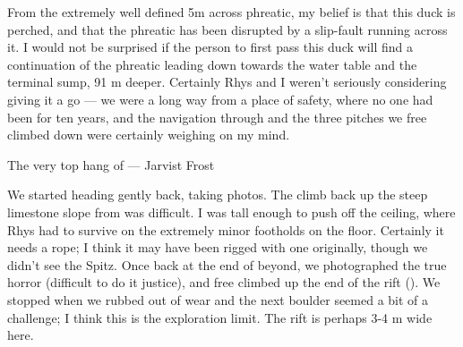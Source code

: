 From the extremely well defined 5m across phreatic, my belief is that this duck is perched, and that the phreatic has been disrupted by a slip-fault running across it. I would not be surprised if the person to first pass this duck will find a continuation of the phreatic leading down towards the water table and the terminal sump, 91 m deeper.
Certainly Rhys and I weren't seriously considering giving it a go --- we were a long way from a place of safety, where no one had been for ten years, and the navigation through  and the three pitches we free climbed down were certainly weighing on my mind.

\begin{marginfigure}
\checkoddpage \ifoddpage \forcerectofloat \else \forceversofloat \fi
\centering
{}
\caption{The very top hang of \protect{}  --- Jarvist Frost}
\label{SpaceOdyssey}
\end{marginfigure}

We started heading gently back, taking photos. The climb back up the steep limestone slope from  was difficult. I was tall enough to push off the ceiling, where Rhys had to survive on the extremely minor footholds on the floor. Certainly it needs a rope; I think it may have been rigged with one originally, though we didn't see the Spitz.
Once back at the end of beyond, we photographed the true horror (difficult to do it justice), and free climbed up the end of the rift (). We stopped when we rubbed out of wear and the next boulder seemed a bit of a challenge; I think this is the exploration limit. The rift is perhaps 3-4 m wide here.

